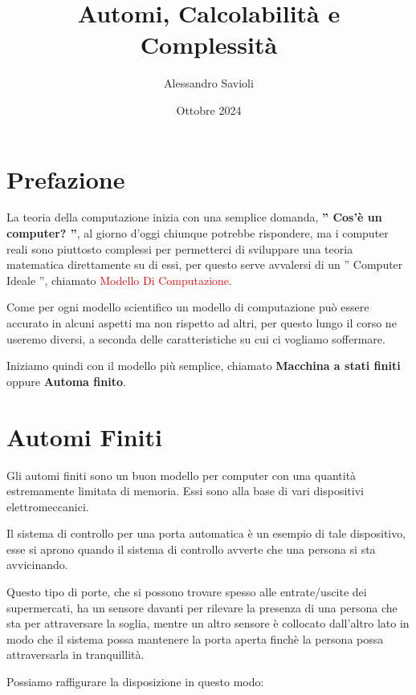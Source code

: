 \documentclass{article}
\begin{document}
\title{Automi, Calcolabilità e Complessità}
\author{Alessandro Savioli}
\date{Ottobre 2024}

\maketitle

\tableofcontents

\newpage

\section{Prefazione}

La teoria della computazione inizia con una semplice domanda, \textbf{'' Cos'è un
computer? ''}, al giorno d'oggi chiunque potrebbe rispondere, ma i computer reali
sono piuttosto complessi per permetterci di sviluppare una teoria matematica
direttamente su di essi, per questo serve avvalersi di un '' Computer Ideale '',
chiamato \textcolor{red}{Modello Di Computazione}.

Come per ogni modello scientifico un modello di computazione può essere accurato
in alcuni aspetti ma non rispetto ad altri, per questo lungo il corso ne useremo
diversi, a seconda delle caratteristiche su cui ci vogliamo soffermare.

Iniziamo quindi con il modello più semplice, chiamato \textbf{Macchina a stati
finiti} oppure \textbf{Automa finito}.

\section{Automi Finiti}
Gli automi finiti sono un buon modello per computer con una quantità
estremamente limitata di memoria. Essi sono alla base di vari dispositivi
elettromeccanici. 

Il sistema di controllo per una porta automatica è un esempio di tale
dispositivo, esse si aprono quando il sistema di controllo avverte che una
persona si sta avvicinando. 

Questo tipo di porte, che si possono trovare spesso alle entrate/uscite dei
supermercati, ha un sensore davanti per rilevare la presenza di una persona che
sta per attraversare la soglia, mentre un altro sensore è collocato dall'altro
lato in modo che il sistema possa mantenere la porta aperta finchè la persona
possa attraversarla in tranquillità. 

Possiamo raffigurare la disposizione in questo modo: 
\end{document}
